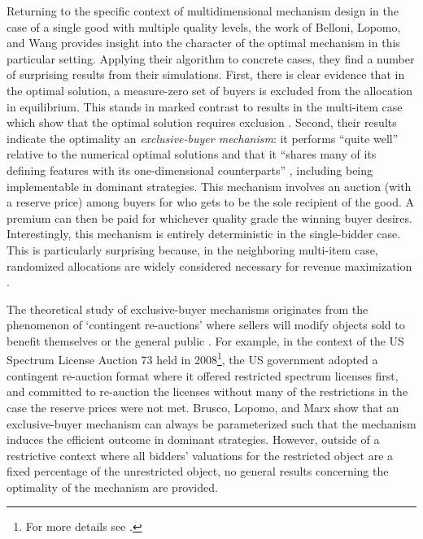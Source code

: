 Returning to the specific context of multidimensional mechanism design in the case of a single good with multiple quality levels, the work of Belloni, Lopomo, and Wang \autocite*{belloni2010multidimensional} provides insight into the character of the optimal mechanism in this particular setting. Applying their algorithm to concrete cases, they find a number of surprising results from their simulations. First, there is clear evidence that in the optimal solution, a measure-zero set of buyers is excluded from the allocation in equilibrium. This stands in marked contrast to results in the multi-item case which show that the optimal solution requires exclusion \autocite{rochet1998ironing, armstrong1996multiproduct}. Second, their results indicate the optimality an \textit{exclusive-buyer mechanism}: it performs ``quite well'' relative to the numerical optimal solutions and that it ``shares many of its defining features with its one-dimensional counterparts'' \autocite[p1085-6]{belloni2010multidimensional}, including being implementable in dominant strategies. This mechanism involves an auction (with a reserve price) among buyers for who gets to be the sole recipient of the good. A premium can then be paid for whichever quality grade the winning buyer desires. Interestingly, this mechanism is entirely deterministic in the single-bidder case.  This is particularly surprising because, in the neighboring multi-item case, randomized allocations are widely considered necessary for revenue maximization \autocite{daskalakis2015multi}.

The theoretical study of exclusive-buyer mechanisms originates from the phenomenon of `contingent re-auctions' where sellers will modify objects sold to benefit themselves or the general public \autocite{brusco2011}. For example, in the context of the US Spectrum License Auction 73 held in 2008\footnote{For more details see \autocite{brusco2009google}.}, the US government adopted a contingent re-auction format where it offered restricted spectrum licenses first, and committed to re-auction the licenses without many of the restrictions in the case the reserve prices were not met. Brusco, Lopomo, and Marx \autocite*{brusco2011} show that an exclusive-buyer mechanism can always be parameterized such that the mechanism induces the efficient outcome in dominant strategies. However, outside of a restrictive context where all bidders' valuations for the restricted object are a fixed percentage of the unrestricted object, no general results concerning the optimality of the mechanism are provided.

